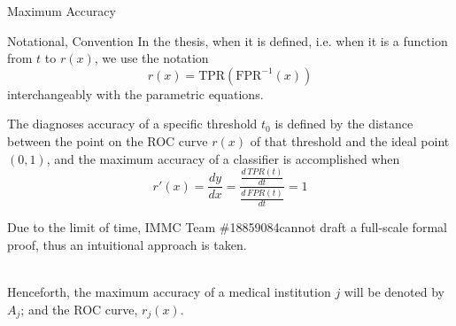 \documentclass[8pt, hyperref={colorlinks=true}]{beamer}
\newcommand{\team}{IMMC Team \#18859084\hphantom{a}}
\begin{document}
\begin{frame}{Maximum Accuracy}
\begin{block}{Notational, Convention}
In the thesis, when it is defined, i.e. when it is a function from $t$ to $r(x)$, we use the notation
\[
r(x)=\text{TPR}(\text{FPR}^{-1}(x))
\]
interchangeably with the parametric equations.
\end{block}

\begin{theorem}
The diagnoses accuracy of a specific threshold $t_0$ is defined by the distance between the point on the ROC curve $r(x)$ of that threshold and the ideal point $(0,1)$, and the maximum accuracy of a classifier is accomplished when
\[
r'(x)=\frac{dy}{dx}=\frac{\displaystyle\frac{d\,TPR(t)}{dt}}{\displaystyle\frac{d\,FPR(t)}{dt}}=1
\]
\end{theorem}
Due to the limit of time, \team cannot draft a full-scale formal proof, thus an intuitional approach is taken.\\~\

Henceforth, the maximum accuracy of a medical institution $j$ will be denoted by $A_j$; and the ROC curve, $r_j(x)$.
\end{frame}


\end{document}
